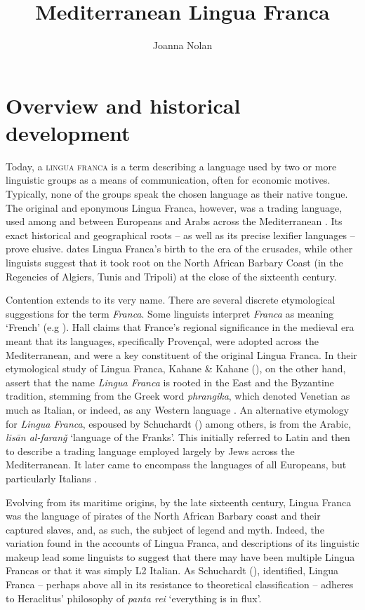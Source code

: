 \documentclass[output=paper]{langsci/langscibook}
\title{Mediterranean Lingua Franca}
\author{Joanna Nolan\affiliation{SOAS University of London}}
\begin{document}
	
\section{Overview and historical development}
	
	Today, a \textsc{lingua franca} is a term describing a language used by two or more linguistic groups as a means of communication, often for economic motives. Typically, none of the groups speak the chosen language as their native tongue. The original and eponymous Lingua Franca, however, was a trading language, used among and between Europeans and Arabs across the Mediterranean \citep{KahaneKahane1976}. Its exact historical and geographical roots – as well as its precise lexifier languages – prove elusive. \citet{Hall1966} dates Lingua Franca’s birth to the era of the crusades, while other linguists \citep{Cifoletti2004,Minervini1996} suggest that it took root on the North African Barbary Coast (in the Regencies of Algiers, Tunis and Tripoli) at the close of the sixteenth century. 
	
	Contention extends to its very name. There are several discrete etymological suggestions for the term \textit{Franca}.  Some linguists interpret \textit{Franca} as meaning ‘French’ (e.g \citealt[3]{Hall1966}). Hall claims that France’s regional significance in the medieval era meant that its languages, specifically Provençal, were adopted across the Mediterranean, and were a key constituent of the original Lingua Franca. In their etymological study of Lingua Franca, Kahane \& Kahane (\citeyear[25]{KahaneKahane1976}), on the other hand, assert that the name \textit{Lingua Franca} is rooted in the East and the Byzantine tradition, stemming from the Greek word \textit{phrangika}, which denoted Venetian as much as Italian, or indeed, as any Western language \citep[31]{KahaneKahane1976}. An alternative etymology for \textit{Lingua Franca}, espoused by Schuchardt (\citeyear[74]{Schuchardt1909}) among others, is from the Arabic, \textit{lisān al-faranǧ} ‘language of the Franks’. This initially referred to Latin and then to describe a trading language employed largely by Jews across the Mediterranean. It later came to encompass the languages of all Europeans, but particularly Italians \citep[26]{KahaneKahane1976}.  
	
	Evolving from its maritime origins, by the late sixteenth century, Lingua Franca was the language of pirates of the North African Barbary coast and their captured slaves, and, as such, the subject of legend and myth. Indeed, the variation found in the accounts of Lingua Franca, and descriptions of its linguistic makeup lead some linguists \citep{Minervini1996,Mori2016} to suggest that there may have been multiple Lingua Francas or that it was simply L2 Italian. As Schuchardt (\citeyear[88]{Schuchardt1909}), identified, Lingua Franca – perhaps above all in its resistance to theoretical classification – adheres to Heraclitus’ philosophy of \textit{panta rei}  ‘everything is in flux’. 
	
\end{document}
